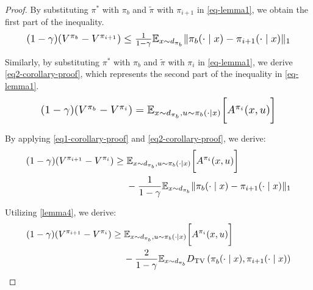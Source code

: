 \begin{proof}
By substituting $\pi^*$ with $\pi_{b}$ and $\tilde{\pi}$ with $\pi_{i+1}$ in \autoref{eq-lemma1}, we obtain the first part of the inequality. 
\begin{equation}
\resizebox{0.9\hsize}{!}{$
(1-\gamma)(V^{\pi_b}-V^{{\pi_{i+1}}}) \leq \frac{1}{1-\gamma} \mathbb{E}_{x \sim d_{\pi_b}} \| {\pi_b}(\cdot \mid x)-{\pi_{i+1}}(\cdot \mid x) \|_1
$}
\label{eq1-corollary-proof}
\end{equation}


Similarly, by substituting $\pi^*$ with $\pi_{b}$ and $\tilde{\pi}$ with $\pi_{i}$ in \autoref{eq-lemma1}, we derive \autoref{eq2-corollary-proof}, which represents the second part of the inequality in \autoref{eq-lemma1}.
\begin{equation}
\resizebox{0.8\hsize}{!}{$
(1-\gamma)(V^{\pi_b}-V^{{\pi_{i}}}) = \mathbb{E}_{x \sim d_{\pi_b}, u \sim \pi_b(\cdot \mid x)} \bigg[ A^{\pi_i}(x, u) \bigg]
$}
\label{eq2-corollary-proof}
\end{equation}

By applying \autoref{eq1-corollary-proof} and \autoref{eq2-corollary-proof}, we derive:
\begin{equation}
\resizebox{0.9\hsize}{!}{$
\begin{aligned}
(1-\gamma)(V^{\pi_{i+1}}-V^{{\pi_{i}}}) & \geq \mathbb{E}_{x \sim d_{\pi_b}, u \sim \pi_b(\cdot \mid x)} \bigg[ A^{\pi_i}(x, u) \bigg] \\
& \quad\; -\frac{1}{1-\gamma} \mathbb{E}_{x \sim d_{\pi_b}} \| {\pi_b}(\cdot \mid x)-{\pi_{i+1}}(\cdot \mid x) \|_1
\end{aligned}
$}
\label{eq3-corollary-proof}
\end{equation}

Utilizing \autoref{lemma4}, we derive:
\begin{equation}
\resizebox{0.9\hsize}{!}{$
\begin{aligned}
(1-\gamma)(V^{\pi_{i+1}}-V^{{\pi_{i}}}) & \geq \mathbb{E}_{x \sim d_{\pi_b}, u \sim \pi_b(\cdot \mid x)} \bigg[ A^{\pi_i}(x, u) \bigg] \\
& \quad\; -\frac{2}{1-\gamma} \mathbb{E}_{x \sim d_{\pi_b}} D_{\mathrm{TV}}\left(\pi_b^{}(\cdot \mid x), \pi_{i+1}(\cdot \mid x)\right)
\end{aligned}
$}
\label{eq4-corollary-proof}
\end{equation}
\end{proof}



